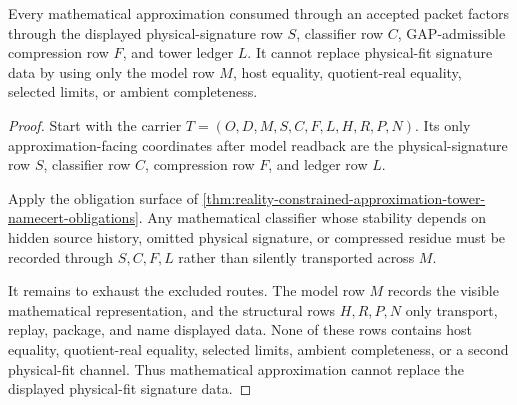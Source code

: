 \begin{theorem}
\label{thm:reality-constrained-approximation-tower-nonescape}
Every mathematical approximation consumed through an accepted \RealityConstrainedApproximationTowerUp packet factors through the displayed physical-signature row $S$, classifier row $C$, GAP-admissible compression row $F$, and tower ledger $L$. It cannot replace physical-fit signature data by using only the model row $M$, host equality, quotient-real equality, selected limits, or ambient completeness.
\end{theorem}
\begin{proof}
Start with the carrier $T=(O,D,M,S,C,F,L,H,R,P,N)$. Its only approximation-facing coordinates after model readback are the physical-signature row $S$, classifier row $C$, compression row $F$, and ledger row $L$.

Apply the obligation surface of \autoref{thm:reality-constrained-approximation-tower-namecert-obligations}. Any mathematical classifier whose stability depends on hidden source history, omitted physical signature, or compressed residue must be recorded through $S,C,F,L$ rather than silently transported across $M$.

It remains to exhaust the excluded routes. The model row $M$ records the visible mathematical representation, and the structural rows $H,R,P,N$ only transport, replay, package, and name displayed data. None of these rows contains host equality, quotient-real equality, selected limits, ambient completeness, or a second physical-fit channel. Thus mathematical approximation cannot replace the displayed physical-fit signature data.
\end{proof}

